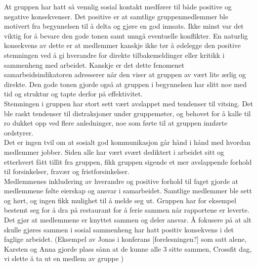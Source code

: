 At gruppen har hatt så vennlig sosial kontakt medfører til både positive og negative konsekvenser.
Det positive er at samtlige gruppenmedlemmer ble motivert fra begynnelsen til å delta og gjøre en god innsats.
Ikke minst var det viktig for å bevare den gode tonen samt unngå eventuelle konflikter.
En naturlig konsekvens av dette er at medlemmer kanskje ikke tør å ødelegge den positive stemningen ved å gi hverandre for direkte tilbakemeldinger eller kritikk i sammenheng med arbeidet.
Kanskje er det dette fenomenet samarbeidsindikatoren adresserer når den viser at gruppen av vært lite ærlig og direkte.
Den gode tonen gjorde også at gruppen i begynnelsen har slitt noe med tid og struktur og tapte derfor på effektivitet. \\

Stemningen i gruppen har stort sett vært avslappet med tendenser til vitsing.
Det ble raskt tendenser til distraksjoner under gruppemøter, og behovet for å kalle til ro dukket opp ved flere anledninger, noe som førte til at gruppen innførte ordstyrer. \\

Det er ingen tvil om at sosialt god kommunikasjon går hånd i hånd med hvordan medlemmer jobber.
Siden alle har vært svært dediktert i arbeidet sitt og etterhvert fått tillit fra gruppen, fikk gruppen sigende et mer avslappende forhold til forsinkelser, fravær og fristforsinkelser. \\

Medlemmenes inkludering av hverandre og positive forhold til faget gjorde at medlemmene følte eierskap og ansvar i samarbeidet.
Samtlige medlemmer ble sett og hørt, og ingen fikk mulighet til å melde seg ut.
Gruppen har for eksempel bestemt seg for å dra på restaurant for å ferie sammen når rapportene er leverte. 
Det gjør at medlemmene er knyttet sammen og deler ansvar.
Å fokusere på at alt skulle gjøres sammen i sosial sammenheng har hatt positiv konsekvens i det faglige arbeidet.
\iffalse
(Eksempel av Jonas i konferans [forelesningen?] som satt alene, Karsten og Anna gjorde plass sånn at de kunne alle 3 sitte sammen, Crossfit dag, vi slette å ta ut en medlem av gruppe )


